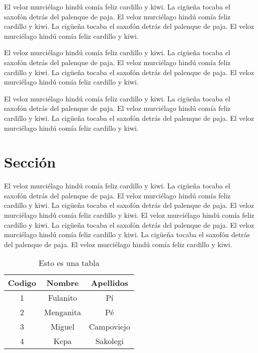 El veloz murciélago hindú comía feliz cardillo y kiwi.  La cigüeña tocaba el saxofón detrás del palenque de paja.  El veloz murciélago hindú comía feliz cardillo y kiwi.  La cigüeña tocaba el saxofón detrás del palenque de paja.  El veloz murciélago hindú comía feliz cardillo y kiwi.

El veloz murciélago hindú comía feliz cardillo y kiwi.  La cigüeña tocaba el saxofón detrás del palenque de paja.  El veloz murciélago hindú comía feliz cardillo y kiwi.  La cigüeña tocaba el saxofón detrás del palenque de paja.  El veloz murciélago hindú comía feliz cardillo y kiwi.


El veloz murciélago hindú comía feliz cardillo y kiwi.  La cigüeña tocaba el saxofón detrás del palenque de paja.  El veloz murciélago hindú comía feliz cardillo y kiwi.  La cigüeña tocaba el saxofón detrás del palenque de paja.  El veloz murciélago hindú comía feliz cardillo y kiwi.

\section{Sección} 

El veloz murciélago hindú comía feliz cardillo y kiwi.  La cigüeña tocaba el saxofón detrás del palenque de paja.  El veloz murciélago hindú comía feliz cardillo y kiwi.  La cigüeña tocaba el saxofón detrás del palenque de paja.  El veloz murciélago hindú comía feliz cardillo y kiwi. El veloz murciélago hindú comía feliz cardillo y kiwi.  La cigüeña tocaba el saxofón detrás del palenque de paja.  El veloz murciélago hindú comía feliz cardillo y kiwi.  La cigüeña tocaba el saxofón detrás del palenque de paja.  El veloz murciélago hindú comía feliz cardillo y kiwi.

\begin{table}
\begin{center}
\begin{tabular}{|c|c|c|}
\hline Codigo & Nombre & Apellidos \\ 
\hline\hline 1 & Fulanito & Pí \\ 
\hline 2 & Menganita & Pé \\ 
\hline 3 & Miguel & Campoviejo \\ 
\hline 4 & Kepa & Sakolegi \\ 
\hline 
\end{tabular} 
\caption{Esto es una tabla}
\label{tbTabla3}
\end{center}
\end{table}

